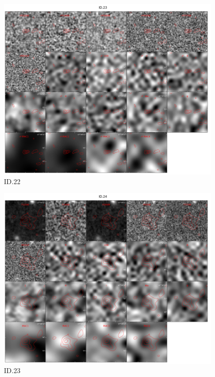 \begin{figure}[tbp]
\centering \includegraphics[width=120mm]{Matched/ASPECS_Cutout_22.jpg}
\caption{ID.22}
\label{fig:Match_Three}
\end{figure}

\begin{figure}[tbp]
\centering \includegraphics[width=120mm]{Matched/ASPECS_Cutout_23.jpg}
\caption{ID.23}
\label{fig:Match_Three}
\end{figure}

